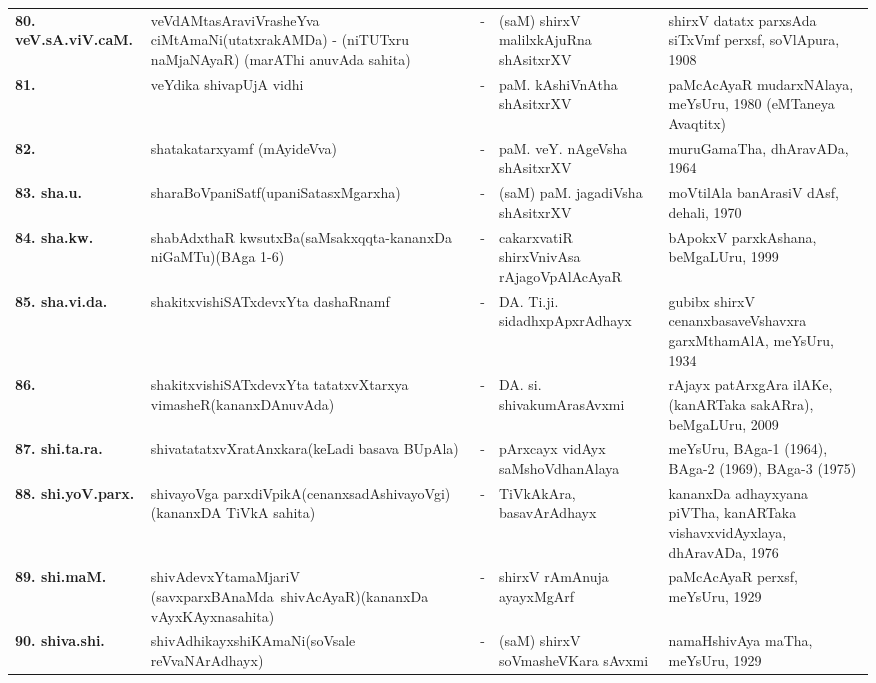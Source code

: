 {\begin{longtable}{lp{5cm}cp{5cm}<{\raggedright}p{3cm}<{\raggedright}@{}}
{\bf 80. veV.sA.viV.caM.} & veVdAMtasAraviVrasheYva ciMtAmaNi\newline (utatxrakAMDa) - (niTUTxru naMja\-NAyaR) (marAThi anuvAda sahita) &-& (saM) shirxV malilxkAjuRna shAsitxrXV & shirxV datatx parxsAda siTxVmf perxsf, soVlApura, 1908\\
{\bf 81. } & veYdika shivapUjA vidhi &-& paM. kAshiVnAtha shAsitxrXV & paMcAcAyaR mudarxNAlaya, meYsUru, 1980 (eMTaneya Avaqtitx)\\
{\bf 82. } & shatakatarxyamf (mAyideVva) &-& paM. veY. nAgeVsha shAsitxrXV & muruGamaTha, dhAravADa, 1964\\
{\bf 83. sha.u.} & sharaBoVpaniSatf\newline (upaniSatasxMgarxha) &-& (saM) paM. jagadiVsha shAsitxrXV & moVtilAla banArasiV dAsf, dehali, 1970\\
{\bf 84. sha.kw.} & shabAdxthaR kwsutxBa\newline (saMsakxqqta-kananxDa niGaMTu)\newline (BAga 1-6) &-& cakarxvatiR shirxVnivAsa rAjagoVpAlAcAyaR & bApokxV parxkAshana, beMgaLUru, 1999\\
{\bf 85. sha.vi.da.} & shakitxvishiSATxdevxYta dashaRnamf &-& DA. Ti.ji. sidadhxpApxrAdhayx & gubibx shirxV cenanxbasaveVshavxra garxMthamAlA, meYsUru, 1934\\
{\bf 86. } & shakitxvishiSATxdevxYta tatatxvXtarxya vimasheR\newline (kananxDAnuvAda) &-& DA. si. shivakumArasAvxmi & rAjayx patArxgAra ilAKe, (kanARTaka sakARra), beMgaLUru, 2009\\
{\bf 87. shi.ta.ra.} & shivatatatxvXratAnxkara\newline (keLadi basava BUpAla) &-& pArxcayx vidAyx saMshoVdhanAlaya & meYsUru, BAga-1 (1964), BAga-2 (1969), BAga-3 (1975)\\
{\bf 88. shi.yoV.parx.} & shivayoVga parxdiVpikA\newline (\hbox{cenanxsadAshiva\-yoVgi})\newline (kananxDA TiVkA sahita) &-& TiVkAkAra, basavArAdhayx & kananxDa adhayxyana piVTha, kanARTaka vishavxvidAyxlaya, dhAravADa, 1976\\
{\bf 89. shi.maM.} & shivAdevxYtamaMjariV \hbox{(savxparxBAnaMda shivAcAyaR)}\newline (kananxDa vAyxKAyxnasahita) &-& shirxV rAmAnuja ayayxMgArf & paMcAcAyaR perxsf, meYsUru, 1929\\
{\bf 90. shiva.shi.} & shivAdhikayxshiKAmaNi\newline (soVsale \hbox{reVvaNArAdhayx}) &-& (saM) shirxV soVmasheVKara sAvxmi & namaHshivAya maTha, meYsUru, 1929\\

\end{longtable}}
